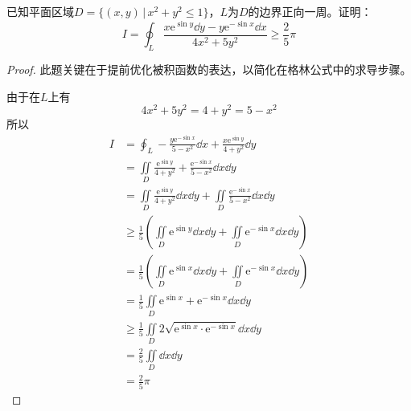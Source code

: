 \begin{example}
    已知平面区域$D=\{ (x,y)\,|\, x^2+y^2\leq 1 \}$，$L$为$D$的边界正向一周。证明：
    \[ I = \oint_L \frac{x\mathrm{e}^{\sin y}\dd{y} - y\mathrm{e}^{-\sin x}\dd{x}}{4x^2+5y^2} \geq \frac{2}{5}\pi \]
\end{example}
\begin{proof}
    此题关键在于提前优化被积函数的表达，以简化在格林公式中的求导步骤。

    由于在$L$上有
    \[ 4x^2+5y^2 = 4 + y^2 = 5 - x^2 \]
    所以
    \begin{align*}
        I & = \oint_L -\frac{y\mathrm{e}^{-\sin x}}{5-x^2}\dd{x} + \frac{x\mathrm{e}^{\sin y}}{4 + y^2}\dd{y}                                \\
          & = \iint\limits_D \frac{\mathrm{e}^{\sin y}}{4+y^2} + \frac{\mathrm{e}^{-\sin x}}{5-x^2} \dd{x}\dd{y}                             \\
          & = \iint\limits_D \frac{\mathrm{e}^{\sin y}}{4+y^2}\dd{x}\dd{y} + \iint\limits_D\frac{\mathrm{e}^{-\sin x}}{5-x^2} \dd{x}\dd{y}   \\
          & \geq \frac{1}{5}\left(\iint\limits_D \mathrm{e}^{\sin y} \dd{x}\dd{y} + \iint\limits_D \mathrm{e}^{-\sin x} \dd{x}\dd{y} \right) \\
          & = \frac{1}{5}\left(\iint\limits_D \mathrm{e}^{\sin x} \dd{x}\dd{y} + \iint\limits_D \mathrm{e}^{-\sin x} \dd{x}\dd{y} \right)    \\
          & = \frac{1}{5}\iint\limits_D \mathrm{e}^{\sin x} + \mathrm{e}^{-\sin x} \dd{x}\dd{y}                                              \\
          & \geq \frac{1}{5}\iint\limits_D 2\sqrt{\mathrm{e}^{\sin x}\cdot\mathrm{e}^{-\sin x}} \dd{x}\dd{y}                                 \\
          & = \frac{2}{5}\iint\limits_D \dd{x}\dd{y}                                                                                         \\
          & = \frac{2}{5}\pi
    \end{align*}

\end{proof}


